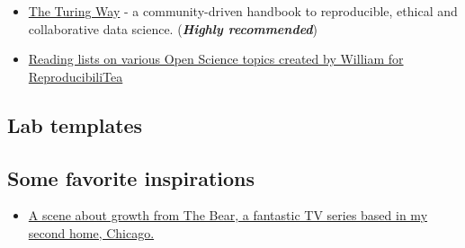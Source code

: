 \documentclass[
]{book}
\providecommand{\tightlist}{%
  \setlength{\itemsep}{0pt}\setlength{\parskip}{0pt}}
\begin{document}
\begin{itemize}
\tightlist
\item
  \href{https://the-turing-way.netlify.app/index.html}{The Turing Way} - a community-driven handbook to reproducible, ethical and collaborative data science. (\textbf{\emph{Highly recommended}})
\item
  \href{https://williamngiam.github.io/reading_lists/}{Reading lists on various Open Science topics created by William for ReproducibiliTea}
\end{itemize}

\hypertarget{lab-templates}{%
\subsection{Lab templates}\label{lab-templates}}

\hypertarget{some-favorite-inspirations}{%
\subsection{Some favorite inspirations}\label{some-favorite-inspirations}}

\begin{itemize}
\tightlist
\item
  \href{https://youtu.be/CT2vwm4oY00}{A scene about growth from The Bear, a fantastic TV series based in my second home, Chicago.}
\end{itemize}

  
\end{document}
